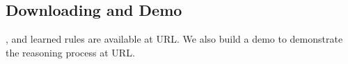 

\subsection{Downloading and Demo}
\zhpro, \zhcon and learned rules are available at URL.
We also build a demo to demonstrate the reasoning process at URL. 



